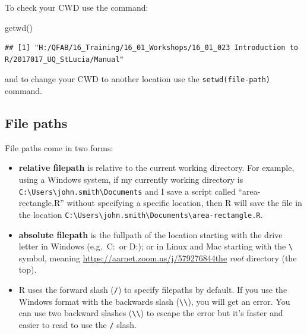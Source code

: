 \documentclass[a4paper]{book}
\newenvironment{Shaded}{}{}
\newcommand{\KeywordTok}[1]{\textcolor[rgb]{0.00,0.00,1.00}{{#1}}}
\newcommand{\NormalTok}[1]{{#1}}
\providecommand{\tightlist}{%
  \setlength{\itemsep}{0pt}\setlength{\parskip}{0pt}}
\newlength{\leftbarwidth}
\newlength{\leftbarsep}
\newcommand*{\leftbarcolorcmd}{\color{darkgray}}%
\renewenvironment{leftbar}{%
    \def\FrameCommand{{\leftbarcolorcmd{\vrule width \leftbarwidth\relax\hspace {\leftbarsep}}}}%
    \MakeFramed {\advance \hsize -\width \FrameRestore }%
}{%
    \endMakeFramed
}
\renewenvironment{Shaded}
{\vspace{0em}\begin{leftbar}\begin{snugshade}}
{\end{snugshade}\end{leftbar}\vspace{0pt}}
\newenvironment{rmdblock}[1]
  {\vspace{1.5em}\begin{shaded*}
  \begin{itemize}
  \renewcommand{\labelitemi}{
    \raisebox{-.7\height}[0pt][0pt]{
      {\setkeys{Gin}{width=3em,keepaspectratio}\texttt{[image: images/\#1]}}
    }
  }
  \item
  }
  {
  \end{itemize}
  \end{shaded*}
  }
\newenvironment{rmdtip}
  {\begin{rmdblock}{tip}}
  {\end{rmdblock}}
\begin{document}
To check your CWD use the command:

\begin{Shaded}
\begin{Highlighting}[]
\KeywordTok{getwd}\NormalTok{()}
\end{Highlighting}
\end{Shaded}

\begin{verbatim}
## [1] "H:/QFAB/16_Training/16_01_Workshops/16_01_023 Introduction to R/2017017_UQ_StLucia/Manual"
\end{verbatim}

and to change your CWD to another location use the
\texttt{setwd(file-path)} command.

\subsection{File paths}\label{file-paths}

File paths come in two forms:

\begin{itemize}
\tightlist
\item
  \textbf{relative filepath} is relative to the current working
  directory. For example, using a Windows system, if my currently
  working directory is
  \texttt{C:\textbackslash{}Users\textbackslash{}john.smith\textbackslash{}Documents}
  and I save a script called ``area-rectangle.R'' without specifying a
  specific location, then R will save the file in the location
  \texttt{C:\textbackslash{}Users\textbackslash{}john.smith\textbackslash{}Documents\textbackslash{}area-rectangle.R}.
\item
  \textbf{absolute filepath} is the fullpath of the location starting
  with the drive letter in Windows (e.g.~C:~or D:); or in Linux and Mac
  starting with the \texttt{\textbackslash{}} symbol, meaning
  \url{https://aarnet.zoom.us/j/579276844the} \emph{root} directory (the
  top).
\end{itemize}

\begin{rmdtip}
R uses the forward slash (\texttt{/}) to specify filepaths by default.
If you use the Windows format with the backwards slash
(\texttt{\textbackslash{}\textbackslash{}}), you will get an error. You
can use two backward slashes (\texttt{\textbackslash{}\textbackslash{}})
to escape the error but it's faster and easier to read to use the
\texttt{/} slash.
\end{rmdtip}
\end{document}

